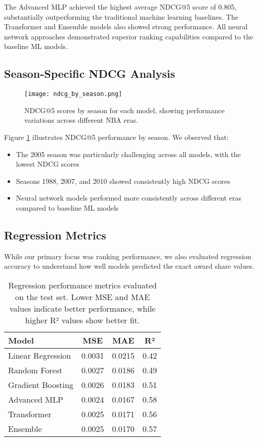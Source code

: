 \documentclass[10pt,twocolumn,letterpaper]{article}
\begin{document}
The Advanced MLP achieved the highest average NDCG@5 score of 0.805, substantially outperforming the traditional machine learning baselines. The Transformer and Ensemble models also showed strong performance. All neural network approaches demonstrated superior ranking capabilities compared to the baseline ML models.

\subsection{Season-Specific NDCG Analysis}

\begin{figure}[t]
\begin{center}
\texttt{[image: ndcg\_by\_season.png]}
\end{center}
\caption{NDCG@5 scores by season for each model, showing performance variations across different NBA eras.}
\label{fig:ndcg_by_season}
\end{figure}

Figure \ref{fig:ndcg_by_season} illustrates NDCG@5 performance by season. We observed that:

\begin{itemize}
    \item The 2005 season was particularly challenging across all models, with the lowest NDCG scores
    \item Seasons 1988, 2007, and 2010 showed consistently high NDCG scores
    \item Neural network models performed more consistently across different eras compared to baseline ML models
\end{itemize}

\subsection{Regression Metrics}

While our primary focus was ranking performance, we also evaluated regression accuracy to understand how well models predicted the exact award share values.

\begin{table}
\begin{center}
\begin{tabular}{|l|c|c|c|}
\hline
Model & MSE & MAE & R² \\
\hline\hline
Linear Regression & 0.0031 & 0.0215 & 0.42 \\
Random Forest & 0.0027 & 0.0186 & 0.49 \\
Gradient Boosting & 0.0026 & 0.0183 & 0.51 \\
Advanced MLP & 0.0024 & 0.0167 & 0.58 \\
Transformer & 0.0025 & 0.0171 & 0.56 \\
Ensemble & 0.0025 & 0.0170 & 0.57 \\
\hline
\end{tabular}
\end{center}
\caption{Regression performance metrics evaluated on the test set. Lower MSE and MAE values indicate better performance, while higher R² values show better fit.}
\label{tab:regression_metrics}
\end{table}
\end{document}
